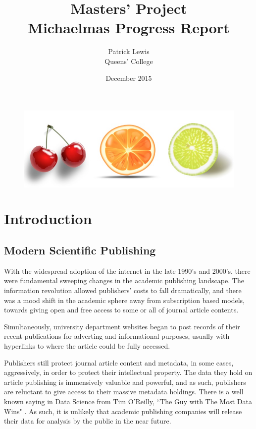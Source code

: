 \documentclass[11pt, oneside]{article}   	%
\title{Masters' Project \\Michaelmas Progress Report}
\author{Patrick Lewis \\Queens' College}
\date{December 2015}							%
\begin{document}
\maketitle
\begin{figure}[H]
    \centering
    \includegraphics[scale=0.5]{TITLE.png}
\end{figure}
\section{Introduction}
\subsection{Modern Scientific Publishing}
With the widespread adoption of the internet in the late 1990's and 2000's, there were fundamental sweeping changes in the academic publishing landscape. The information revolution allowed publishers' costs to fall dramatically, and there was a mood shift in the academic sphere away from subscription based models, towards giving open and free access to some or all of journal article contents.

Simultaneously, university department websites began to post records of their recent publications for adverting and informational purposes, usually with hyperlinks to where the article could be fully accessed.

Publishers still protect journal article content and metadata, in some cases, aggressively, in order to protect their intellectual property. The data they hold on article publishing is immensively valuable and powerful, and as such, publishers are reluctant to give access to their massive metadata holdings. There is a well known saying in Data Science from Tim O'Reilly, ``The Guy with The Most Data Wins" \cite{HEWHOHASDATA}. As such, it is unlikely that academic publishing companies will release their data for analysis by the public in the near future.
\end{document}
